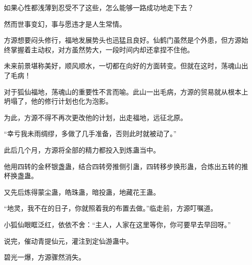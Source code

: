 \begin{this_body}
如果心性都浅薄到忍受不了这些，怎么能够一路成功地走下去？

然而世事变幻，事与愿违才是人生常情。

方源想要闷头修行，福地发展势头也迅猛且良好。仙鹤门虽然是个外患，但方源始终掌握着主动权，对方虽然势大，一段时间内却还拿捏不住他。

未来前景堪称美好，顺风顺水，一切都在向好的方面转变。但就在这时，荡魂山出了毛病！

对于狐仙福地，荡魂山的重要性不言而喻。此山一出毛病，方源的贸易就从根本上坍塌了，他的修行计划也化为泡影。

为此，方源不得不再次更改他的计划，出走福地，远征北原。

“幸亏我未雨绸缪，多做了几手准备，否则此时就被动了。”

此后几个月，方源将全部的精力都投入到炼蛊当中。

他用四转的金杯银盏蛊，结合四转旁推侧引蛊，四转移步换形蛊，合炼出五转的推杯换盏蛊。

又先后炼得蒙尘蛊，皓珠蛊，暗投蛊，地藏花王蛊。

“地灵，我不在的日子，你就照着我的布置去做。”临走前，方源叮嘱道。

小狐仙眼眶泛红，依依不舍：“主人，人家在这里等你，你可要早去早回呀。”

说完，催动青提仙元，灌注到定仙游蛊中。

碧光一爆，方源骤然消失。

\end{this_body}

